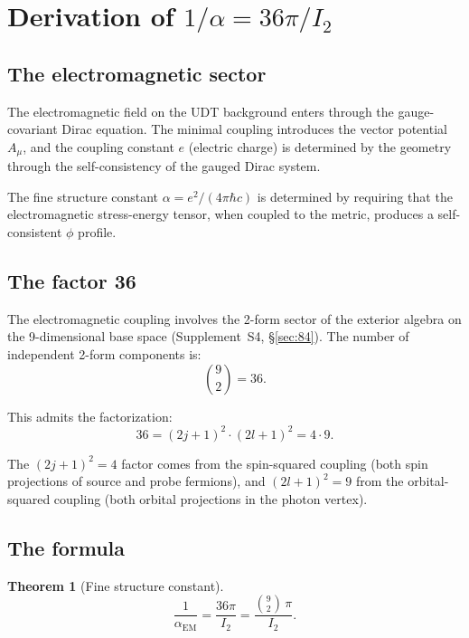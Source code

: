 \documentclass[11pt,letterpaper]{article}
\newtheorem{theorem}{Theorem}[section]
\numberwithin{equation}{section}
\begin{document}
\section{Derivation of $1/\alpha = 36\pi/I_2$}
\label{sec:alpha_derivation}

\subsection{The electromagnetic sector}

The electromagnetic field on the UDT background enters through the
gauge-covariant Dirac equation. The minimal coupling introduces the vector
potential $A_\mu$, and the coupling constant $e$ (electric charge) is
determined by the geometry through the self-consistency of the gauged
Dirac system.

The fine structure constant $\alpha = e^2/(4\pi\hbar c)$ is determined by
requiring that the electromagnetic stress-energy tensor, when coupled to
the metric, produces a self-consistent $\phi$ profile.

\subsection{The factor 36}

The electromagnetic coupling involves the 2-form sector of the exterior
algebra on the 9-dimensional base space (Supplement~S4, \S\ref{sec:84}).
The number of independent 2-form components is:
\begin{equation}
\label{eq:36}
  \binom{9}{2} = 36.
\end{equation}

This admits the factorization:
\begin{equation}
\label{eq:36_decomp}
  36 = (2j+1)^2 \cdot (2l+1)^2 = 4 \cdot 9.
\end{equation}

The $(2j+1)^2 = 4$ factor comes from the spin-squared coupling (both
spin projections of source and probe fermions), and $(2l+1)^2 = 9$ from
the orbital-squared coupling (both orbital projections in the photon
vertex).

\subsection{The formula}

\begin{theorem}[Fine structure constant]
\label{thm:alpha}
\begin{equation}
\label{eq:alpha}
\boxed{
  \frac{1}{\alpha_\mathrm{EM}} = \frac{36\pi}{I_2} = \frac{\binom{9}{2}\,\pi}{I_2}.
}
\end{equation}
\end{theorem}
\end{document}
